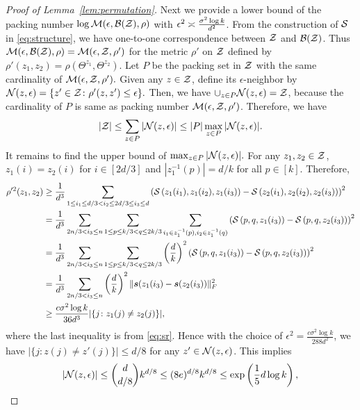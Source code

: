 \documentclass[12pt]{article}
\theoremstyle{definition}
\begin{document}
\begin{proof}[Proof of Lemma~\ref{lem:permutation}]
Next we provide a lower bound of the packing number $\log \mathcal{M}(\epsilon,\mathcal{B}(\mathcal{Z}),\rho)$ with $\epsilon^2 \asymp {\sigma^2\log k \over d^2}$. From the construction of $\mathcal{S}$ in \eqref{eq:structure}, we have one-to-one correspondence between $\mathcal{Z}$ and $\mathcal{B}(\mathcal{Z})$. Thus $\mathcal{M}(\epsilon,\mathcal{B}(\mathcal{Z}),\rho) = \mathcal{M}(\epsilon,\mathcal{Z},\rho')$ for the metric $\rho'$ on $\mathcal{Z}$ defined by $\rho'(z_1,z_2) = \rho(\Theta^{z_1},\Theta^{z_2})$. Let $P$ be the packing set in $\mathcal{Z}$ with the same cardinality of $\mathcal{M}(\epsilon,\mathcal{Z},\rho').$ Given any $z\in\mathcal{Z}$, define its $\epsilon$-neighbor by $\mathcal{N}(z,\epsilon) = \{z'\in\mathcal{Z}\colon \rho'(z,z')\leq \epsilon\}.$ Then, we have $\cup_{z\in P} \mathcal{N}(z,\epsilon) = \mathcal{Z}$, because the cardinality of $P$ is same as packing number $\mathcal{M}(\epsilon,\mathcal{Z},\rho')$. Therefore, we have
\begin{align}\label{eq:packing}
    |\mathcal{Z}|\leq\sum_{z\in P}|\mathcal{N}(z,\epsilon)|\leq |P|\max_{z\in P}|\mathcal{N}(z,\epsilon)|.
\end{align}
It remains to find the upper bound of $\max_{z\in P}|\mathcal{N}(z,\epsilon)|.$ For any $z_1,z_2\in\mathcal{Z}$, $z_1(i) = z_2(i)$ for $i\in[2d/3]$ and $|z_1^{-1}(p)| = d/k$ for all $p\in[k].$ Therefore,
\begin{align}
    \rho'^2(z_1,z_2) &\geq \frac{1}{d^3}\sum_{1\leq i_1\leq d/3<i_2\leq 2d/3\leq i_3\leq d}\left( \mathcal{S}\left(z_1(i_1),z_1(i_2),z_1(i_3)\right)-\mathcal{S}\left(z_2(i_1),z_2(i_2),z_2(i_3)\right)\right)^2\\
    &= \frac{1}{d^3}\sum_{2n/3<i_3\leq n}\sum_{1\leq p \leq k/3< q\leq 2k/3}\sum_{i_1\in z_1^{-1}(p),i_2\in z_1^{-1}(q)}\left( \mathcal{S}\left(p,q,z_1(i_3)\right)-\mathcal{S}\left(p,q,z_2(i_3)\right)\right)^2\\&=
    \frac{1}{d^3}\sum_{2n/3<i_3\leq n}\sum_{1\leq p \leq k/3< q\leq 2k/3}\left(d\over k\right)^2\left( \mathcal{S}\left(p,q,z_1(i_3)\right)-\mathcal{S}\left(p,q,z_2(i_3)\right)\right)^2\\&=
    \frac{1}{d^3}\sum_{2n/3<i_3\leq n}\left(d\over k\right)^2\lVert\bm{s}(z_1(i_3)-\bm{s}(z_2(i_3))\rVert_F^2
    \\&\geq  \frac{c\sigma^2\log k}{36d^3}|\{j\colon z_1(j)\neq z_2(j)\}|,
\end{align}where the last inequality is from \eqref{eq:sr}. Hence with the choice of $\epsilon^2 = \frac{c\sigma^2\log k}{288d^2}$, we have $|\{j\colon z(j)\neq z'(j)\}|\leq d/8$ for any $z'\in\mathcal{N}(z,\epsilon)$.
This implies
\begin{align}\label{eq:n}
    |\mathcal{N}(z,\epsilon)|\leq {d\choose d/8}k^{d/8}\leq (8e)^{d/8}k^{d/8}\leq \exp\left(\frac{1}{5}d\log k\right),
\end{align}

\end{proof}
\end{document}
